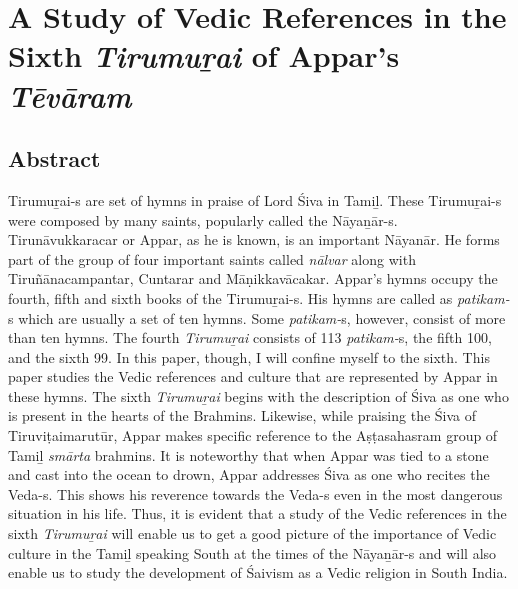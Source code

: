 
\chapter{A Study of Vedic References in the Sixth \textit{Tirumuṟai} of Appar’s \textit{Tēvāram}}\label{chap03}



\section*{Abstract}

Tirumuṟai-s are set of hymns in praise of Lord Śiva in Tamiḻ. These Tirumuṟai-s were composed by many saints, popularly called the Nāyaṉār-s. Tirunāvukkaracar or Appar, as he is known, is an important Nāyanār. He forms part of the group of four important saints called \textit{nālvar} along with Tiruñānacampantar, Cuntarar and Māṇikkavācakar. Appar’s hymns occupy the fourth, fifth and sixth books of the Tirumuṟai-s. His hymns are called as \textit{patikam-}s which are usually a set of ten hymns. Some \textit{patikam-}s, however, consist of more than ten hymns. The fourth \textit{Tirumuṟai} consists of 113 \textit{patikam-}s, the fifth 100, and the sixth 99. In this paper, though, I will confine myself to the sixth. This paper studies the Vedic references and culture that are represented by Appar in these hymns. The sixth \textit{Tirumuṟai} begins with the description of Śiva as one who is present in the hearts of the Brahmins. Likewise, while praising the Śiva of Tiruviṭaimarutūr, Appar makes specific reference to the Aṣṭasahasram group of Tamiḻ \textit{smārta} brahmins. It is noteworthy that when Appar was tied to a stone and cast into the ocean to drown, Appar addresses Śiva as one who recites the Veda-s. This shows his reverence towards the Veda-s even in the most dangerous situation in his life. Thus, it is evident that a study of the Vedic references in the sixth \textit{Tirumuṟai} will enable us to get a good picture of the importance of Vedic culture in the Tamiḻ speaking South at the times of the Nāyaṉār-s and will also enable us to study the development of Śaivism as a Vedic religion in South India.

